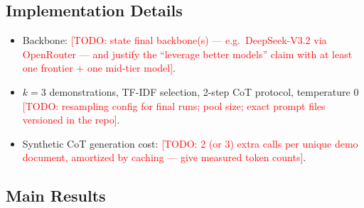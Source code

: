 \documentclass[11pt]{article}
\newcommand{\todo}[1]{\textcolor{red}{[TODO: #1]}}
\begin{document}
\subsection{Implementation Details}
\begin{itemize}
  \item Backbone: \todo{state final backbone(s) --- e.g.\ DeepSeek-V3.2 via
        OpenRouter --- and justify the ``leverage better models'' claim with at
        least one frontier + one mid-tier model}.
  \item $k=3$ demonstrations, TF-IDF selection, 2-step CoT protocol,
        temperature 0 \todo{resampling config for final runs; pool size;
        exact prompt files versioned in the repo}.
  \item Synthetic CoT generation cost: \todo{2 (or 3) extra calls per unique
        demo document, amortized by caching --- give measured token counts}.
\end{itemize}

\subsection{Main Results}
\label{sec:results}
\end{document}
